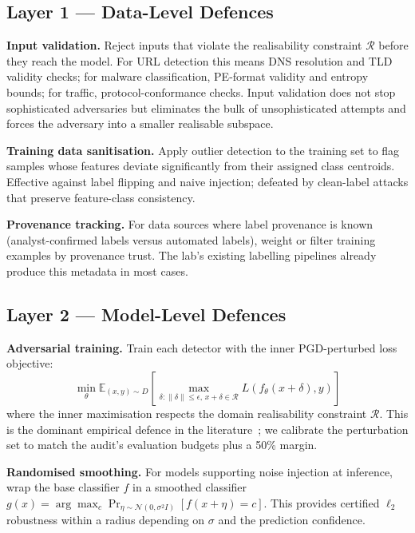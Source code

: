 \documentclass[sigconf,nonacm]{acmart}
\begin{document}
\subsection{Layer 1 — Data-Level Defences}

\textbf{Input validation.} Reject inputs that violate the realisability
constraint $\mathcal{R}$ before they reach the model. For URL detection this
means DNS resolution and TLD validity checks; for malware classification,
PE-format validity and entropy bounds; for traffic, protocol-conformance
checks. Input validation does not stop sophisticated adversaries but
eliminates the bulk of unsophisticated attempts and forces the adversary into
a smaller realisable subspace.

\textbf{Training data sanitisation.} Apply outlier detection to the training
set to flag samples whose features deviate significantly from their assigned
class centroids. Effective against label flipping and naive injection;
defeated by clean-label attacks that preserve feature-class consistency.

\textbf{Provenance tracking.} For data sources where label provenance is
known (analyst-confirmed labels versus automated labels), weight or filter
training examples by provenance trust. The lab's existing labelling pipelines
already produce this metadata in most cases.

\subsection{Layer 2 — Model-Level Defences}

\textbf{Adversarial training.} Train each detector with the inner
PGD-perturbed loss objective:
\begin{equation}
  \min_\theta \mathbb{E}_{(x,y) \sim D}\!\left[
    \max_{\delta : \|\delta\| \leq \epsilon,\, x+\delta \in \mathcal{R}}
    L(f_\theta(x+\delta), y)\right]
\end{equation}
where the inner maximisation respects the domain realisability constraint
$\mathcal{R}$. This is the dominant empirical defence in the
literature~\cite{madry2018pgd}; we calibrate the perturbation set
to match the audit's evaluation budgets plus a 50\% margin.

\textbf{Randomised smoothing.} For models supporting noise injection at
inference, wrap the base classifier $f$ in a smoothed
classifier~\cite{cohen2019randomized}
$g(x) = \arg\max_c \Pr_{\eta \sim \mathcal{N}(0,\sigma^2 I)}[f(x+\eta) = c]$.
This provides certified $\ell_2$ robustness within a radius depending on
$\sigma$ and the prediction confidence.
\end{document}
